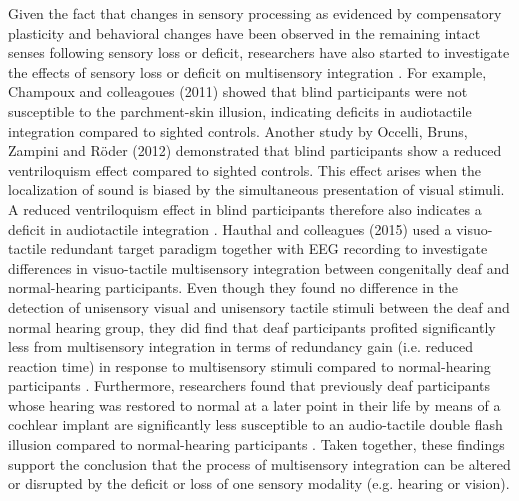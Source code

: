 \documentclass[12pt]{article}
\begin{document}
\par Given the fact that changes in sensory processing as evidenced by compensatory plasticity and behavioral changes have been observed in the remaining intact senses following sensory loss or deficit, researchers have also started to investigate the effects of sensory loss or deficit on multisensory integration \parencite{champoux_early-_2011,collignon_further_2009,hauthal_visuo-tactile_2015,hotting_hearing_2004,karns_altered_2012,landry_temporary_2013,nava_audio-tactile_2014,occelli_audiotactile_2012,peter_sensory_2019}. For example, Champoux and colleagoues (2011) showed that blind participants were not susceptible to the parchment-skin illusion, indicating deficits in audiotactile integration compared to sighted controls. Another study by Occelli, Bruns, Zampini and Röder (2012) demonstrated that blind participants show a reduced ventriloquism effect compared to sighted controls. This effect arises when the localization of sound is biased by the simultaneous presentation of visual stimuli. A reduced ventriloquism effect in blind participants therefore also indicates a deficit in audiotactile integration \parencite{occelli_audiotactile_2012}. Hauthal and colleagues (2015) used a visuo-tactile redundant target paradigm together with EEG recording to investigate differences in visuo-tactile multisensory integration between congenitally deaf and normal-hearing participants. Even though they found no difference in the detection of unisensory visual and unisensory tactile stimuli between the deaf and normal hearing group, they did find that deaf participants profited significantly less from multisensory integration in terms of redundancy gain (i.e. reduced reaction time) in response to multisensory stimuli compared to normal-hearing participants \parencite{hauthal_visuo-tactile_2015}. Furthermore, researchers found that previously deaf participants whose hearing was restored to normal at a later point in their life by means of a cochlear implant are significantly less susceptible to an audio-tactile double flash illusion compared to normal-hearing participants \parencite{landry_temporary_2013}. Taken together, these findings support the conclusion that the process of multisensory integration can be altered or disrupted by the deficit or loss of one sensory modality (e.g. hearing or vision).
\end{document}
